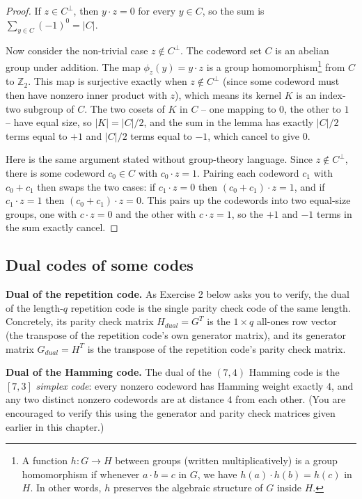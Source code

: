 \begin{proof}
    If \(z \in C^{\perp}\), then \(y \cdot z = 0\) for every \(y \in C\), so the sum is \(\sum_{y \in C} (-1)^0 = |C|\).

    Now consider the non-trivial case \(z \notin C^{\perp}\). The codeword set \(C\) is an abelian group under addition. The map \(\phi_z(y) = y\cdot z\) is a group homomorphism\footnote{A function \(h : G \rightarrow H\) between groups (written multiplicatively) is a group homomorphism if whenever
\(a \cdot b = c\) in \(G\), we have \(h(a) \cdot h(b) = h(c)\) in \(H\). In other words, \(h\) preserves the algebraic structure of \(G\) inside \(H\).
}  from \(C\) to \(\mathbb{Z}_2\). This map is surjective exactly when \(z \notin C^{\perp}\) (since some codeword must then have nonzero inner product with \(z\)), which means its kernel \(K\) is an index-two subgroup of \(C\). The two cosets of \(K\) in \(C\) -- one mapping to \(0\), the other to \(1\) -- have equal size, so \(|K| = |C|/2\), and the sum in the lemma has exactly \(|C|/2\) terms equal to \(+1\) and \(|C|/2\) terms equal to \(-1\), which cancel to give \(0\).

    Here is the same argument stated without group-theory language. Since \(z \notin C^{\perp}\), there is some codeword \(c_0 \in C\) with \(c_0 \cdot z = 1\). Pairing each codeword \(c_1\) with \(c_0 + c_1\) then swaps the two cases: if \(c_1 \cdot z = 0\) then \((c_0+c_1)\cdot z = 1\), and if \(c_1 \cdot z = 1\) then \((c_0+c_1)\cdot z = 0\). This pairs up the codewords into two equal-size groups, one with \(c \cdot z = 0\) and the other with \(c \cdot z = 1\), so the \(+1\) and \(-1\) terms in the sum exactly cancel.
\end{proof}

\subsection{Dual codes of some codes}
\textbf{Dual of the repetition code.} As Exercise 2 below asks you to verify, the dual of the length-\(q\) repetition code is the single parity check code of the same length. Concretely, its parity check matrix \(H_{dual} = G^T\) is the \(1\times q\) all-ones row vector (the transpose of the repetition code's own generator matrix), and its generator matrix \(G_{dual}=H^T\) is the transpose of the repetition code's parity check matrix.

\textbf{Dual of the Hamming code.} The dual of the \((7,4)\) Hamming code is the \([7,3]\) \emph{simplex code}: every nonzero codeword has Hamming weight exactly \(4\), and any two distinct nonzero codewords are at distance \(4\) from each other. (You are encouraged to verify this using the generator and parity check matrices given earlier in this chapter.)

